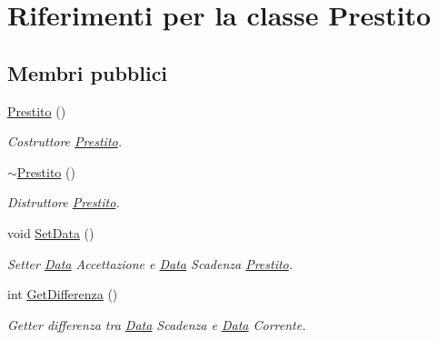 \hypertarget{class_prestito}{}\section{Riferimenti per la classe Prestito}
\label{class_prestito}
\subsection*{Membri pubblici}
\begin{DoxyCompactItemize}
\item 
\mbox{\label{class_prestito_a8052d0f665200b7a4cc232091e0599a7}} 
\mbox{\hyperlink{class_prestito_a8052d0f665200b7a4cc232091e0599a7}{Prestito}} ()
\begin{DoxyCompactList}\small\item\em Costruttore \mbox{\hyperlink{class_prestito}{Prestito}}. \end{DoxyCompactList}\item 
\mbox{\label{class_prestito_a470e008fe1b65ba194d2f06bb303c648}} 
\mbox{\hyperlink{class_prestito_a470e008fe1b65ba194d2f06bb303c648}{$\sim$\+Prestito}} ()
\begin{DoxyCompactList}\small\item\em Distruttore \mbox{\hyperlink{class_prestito}{Prestito}}. \end{DoxyCompactList}\item 
\mbox{\label{class_prestito_a8411d4f827e30d2d35ccb10886823e51}} 
void \mbox{\hyperlink{class_prestito_a8411d4f827e30d2d35ccb10886823e51}{Set\+Data}} ()
\begin{DoxyCompactList}\small\item\em Setter \mbox{\hyperlink{class_data}{Data}} Accettazione e \mbox{\hyperlink{class_data}{Data}} Scadenza \mbox{\hyperlink{class_prestito}{Prestito}}. \end{DoxyCompactList}\item 
int \mbox{\hyperlink{class_prestito_a556664904743c53cc6504a913b0c7394}{Get\+Differenza}} ()
\begin{DoxyCompactList}\small\item\em Getter differenza tra \mbox{\hyperlink{class_data}{Data}} Scadenza e \mbox{\hyperlink{class_data}{Data}} Corrente. \end{DoxyCompactList}\item 

\end{DoxyCompactItemize}
